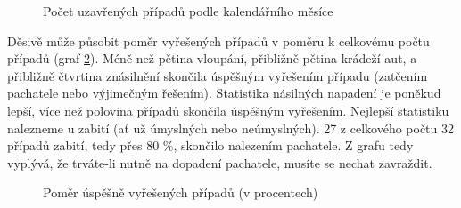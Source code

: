 \documentclass{article}
\begin{document}
\begin{figure}
  \centering
  \caption{Počet uzavřených případů podle kalendářního měsíce}
  \label{fig:clearance_by_month}
\end{figure}

Děsivě může působit poměr vyřešených případů v poměru k celkovému počtu případů (graf
\ref{fig:solved_percentage}). Méně než pětina vloupání, přibližně pětina krádeží aut, a přibližně
čtvrtina znásilnění skončila úspěšným vyřešením případu (zatčením pachatele nebo výjimečným řešením).
Statistika násilných napadení je poněkud lepší, více než polovina případů skončila úspěšným vyřešením.
Nejlepší statistiku nalezneme u zabití (ať už úmyslných nebo neúmyslných). 27 z celkového počtu 32 případů zabití,
tedy přes 80 \%, skončilo nalezením pachatele. Z grafu tedy vyplývá, že trváte-li nutně na dopadení
pachatele, musíte se nechat zavraždit.

\begin{figure}
  \centering
  \caption{Poměr úspěšně vyřešených případů (v procentech)}
  \label{fig:solved_percentage}
\end{figure}
\end{document}
